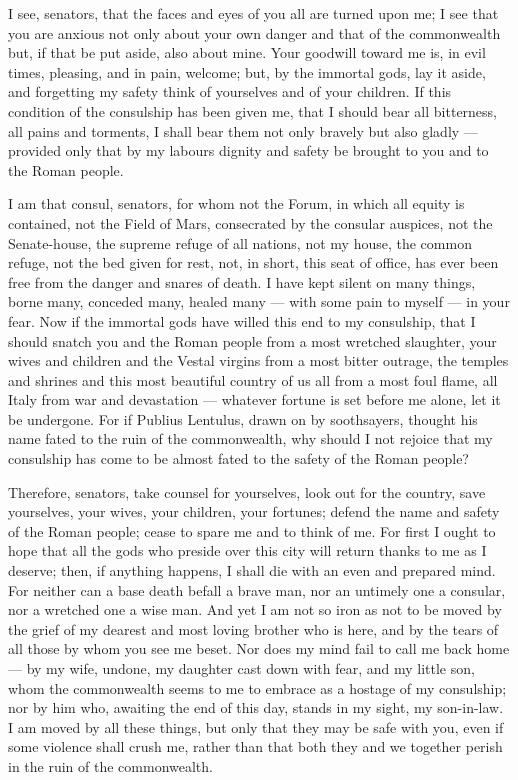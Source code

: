 
 I see, senators, that the faces and eyes of you all are turned upon me; I see that you are anxious not only about your own danger and that of the commonwealth but, if that be put aside, also about mine. Your goodwill toward me is, in evil times, pleasing, and in pain, welcome; but, by the immortal gods, lay it aside, and forgetting my safety think of yourselves and of your children. If this condition of the consulship has been given me, that I should bear all bitterness, all pains and torments, I shall bear them not only bravely but also gladly --- provided only that by my labours dignity and safety be brought to you and to the Roman people.

 I am that consul, senators, for whom not the Forum, in which all equity is contained, not the Field of Mars, consecrated by the consular auspices, not the Senate-house, the supreme refuge of all nations, not my house, the common refuge, not the bed given for rest, not, in short, this seat of office, has ever been free from the danger and snares of death. I have kept silent on many things, borne many, conceded many, healed many --- with some pain to myself --- in your fear. Now if the immortal gods have willed this end to my consulship, that I should snatch you and the Roman people from a most wretched slaughter, your wives and children and the Vestal virgins from a most bitter outrage, the temples and shrines and this most beautiful country of us all from a most foul flame, all Italy from war and devastation --- whatever fortune is set before me alone, let it be undergone. For if Publius Lentulus, drawn on by soothsayers, thought his name fated to the ruin of the commonwealth, why should I not rejoice that my consulship has come to be almost fated to the safety of the Roman people?

 Therefore, senators, take counsel for yourselves, look out for the country, save yourselves, your wives, your children, your fortunes; defend the name and safety of the Roman people; cease to spare me and to think of me. For first I ought to hope that all the gods who preside over this city will return thanks to me as I deserve; then, if anything happens, I shall die with an even and prepared mind. For neither can a base death befall a brave man, nor an untimely one a consular, nor a wretched one a wise man. And yet I am not so iron as not to be moved by the grief of my dearest and most loving brother who is here, and by the tears of all those by whom you see me beset. Nor does my mind fail to call me back home --- by my wife, undone, my daughter cast down with fear, and my little son, whom the commonwealth seems to me to embrace as a hostage of my consulship; nor by him who, awaiting the end of this day, stands in my sight, my son-in-law. I am moved by all these things, but only that they may be safe with you, even if some violence shall crush me, rather than that both they and we together perish in the ruin of the commonwealth.

